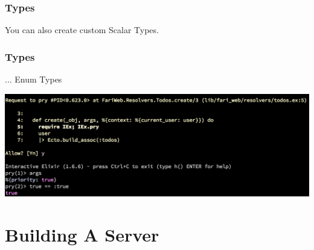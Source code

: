 \documentclass{beamer}
\begin{document}
\begin{frame}
  \frametitle{Types}
  You can also create custom Scalar Types.

  \CustomScalarType
\end{frame}

\begin{frame}
  \frametitle{Types}
  ... Enum Types
  \EnumType

\end{frame}

\begin{frame}
  \begin{center}
    \includegraphics[width=1\paperwidth]{enum_example}
  \end{center}
\end{frame}

\section{Building A Server}
\end{document}
